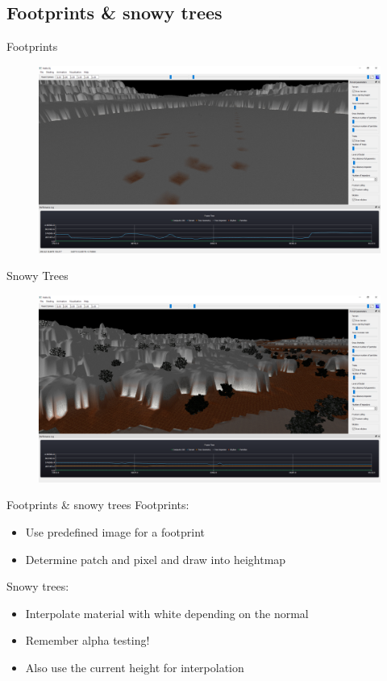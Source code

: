 \documentclass[18pt]{beamer}
\begin{document}
\subsection{Footprints \& snowy trees}
\begin{frame}{Footprints}
	\begin{figure}[H]
		\centering
		\includegraphics[width=15cm]{images/Footprints.PNG}
	\end{figure}
\end{frame}
\begin{frame}{Snowy Trees}
	\begin{figure}[H]
		\centering
		\includegraphics[width=15cm]{images/Trees.PNG}
	\end{figure}
\end{frame}

\begin{frame}{Footprints \& snowy trees}
Footprints:
\begin{itemize}
	\item Use predefined image for a footprint
	\item Determine patch and pixel and draw into heightmap
\end{itemize}
\vspace{0.7cm}
Snowy trees:
\begin{itemize}
	\item Interpolate material with white depending on the normal
	\item Remember alpha testing!
	\item Also use the current height for interpolation
\end{itemize}
\end{frame}
\end{document}
